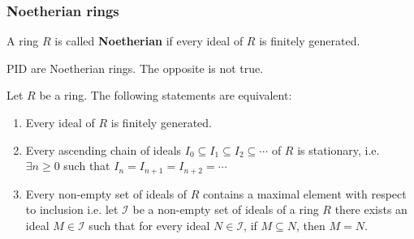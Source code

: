 \documentclass[12pt, a4paper]{article}
\begin{document}
\subsubsection{Noetherian rings}

\begin{definition}
    A ring \(R\) is called \textbf{Noetherian} if every ideal of \(R\) is finitely generated.
\end{definition}

\begin{mdexample}
    PID are Noetherian rings. The opposite is not true.
\end{mdexample}

\begin{mdprop}\label{Noetherian characterisation}
    Let \(R\) be a ring. The following statements are equivalent:
    \begin{enumerate}
        \item Every ideal of \(R\) is finitely generated.
        \item Every ascending chain of ideals \(I_0\subseteq I_1\subseteq I_2\subseteq \cdots\) of \(R\) is stationary, i.e. \(\exists n\geq 0\) such that \(I_n =I_{n+1}=I_{n+2} =\cdots\)
        \item Every non-empty set of ideals of \(R\) contains a maximal element with respect to inclusion i.e. let \( \mathcal{I} \) be a non-empty set of ideals of a ring \( R \) there exists an ideal \( M \in \mathcal{I} \) such that for every ideal \( N \in \mathcal{I} \), if \( M \subseteq N \), then \( M = N \). 
    \end{enumerate}
\end{mdprop}
\end{document}
